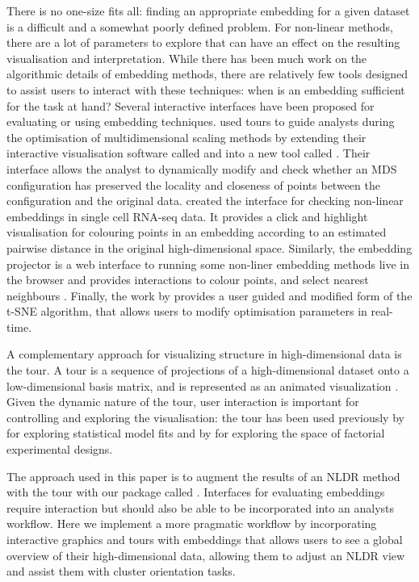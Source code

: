 \documentclass[article,notitle]{jdssv}
\begin{document}
There is no one-size fits all: finding an appropriate embedding for a given
dataset is a difficult and a somewhat poorly defined problem. For non-linear
methods, there are a lot of parameters to explore that can have an effect on
the resulting visualisation and interpretation.
While there has been much work on the algorithmic details of
embedding methods, there are relatively few tools designed to assist users
to interact with these techniques: when is an embedding sufficient for the
task at hand? Several
interactive interfaces have been proposed for evaluating or using embedding
techniques. \citet{Buja2008-fn} used tours to guide analysts during the optimisation
of multidimensional scaling methods by extending their interactive visualisation
software called  and  into a new tool called 
\citep{Swayne1998-uq, Swayne2003-qd, Swayne2004-ua}.
Their interface allows the analyst to dynamically modify and check whether
an MDS configuration has preserved the locality and closeness
of points between the configuration and the original data.
\citet{Ovchinnikova2020-sy} created the  interface for checking
non-linear embeddings in single cell RNA-seq data. It provides a click and
highlight visualisation for colouring points in an embedding according to an
estimated pairwise distance in the original high-dimensional space.
Similarly, the  embedding projector is a web interface to
running some non-liner embedding methods live in the browser and
provides interactions to colour points, and select nearest neighbours
\citep{Smilkov2016-hp}. Finally, the work by \citet{Pezzotti2017-cz} provides a user
guided and modified form of the t-SNE algorithm, that allows users to modify
optimisation parameters in real-time.

A complementary approach for visualizing structure in high-dimensional data is
the tour. A tour is a sequence of projections of a high-dimensional dataset
onto a low-dimensional basis matrix, and is represented as an
animated visualization \citep{Asimov1985-vp, Buja1986-zr}. Given the dynamic
nature of the tour, user interaction is important for controlling and
exploring the visualisation: the tour has been used previously by
\citet{Wickham2015-cx} for exploring statistical model fits and by \citet{Buja1996-fk} for
exploring the space of factorial experimental designs.

The approach used in this paper is to augment the results of an NLDR method with the tour with our package called . Interfaces for evaluating
embeddings require interaction but should also be able to be incorporated into
an analysts workflow. Here we implement a more pragmatic workflow by
incorporating interactive graphics and tours with embeddings that allows users
to see a global overview of their high-dimensional data, allowing them to
adjust an NLDR view and assist them with cluster orientation tasks.
\end{document}
